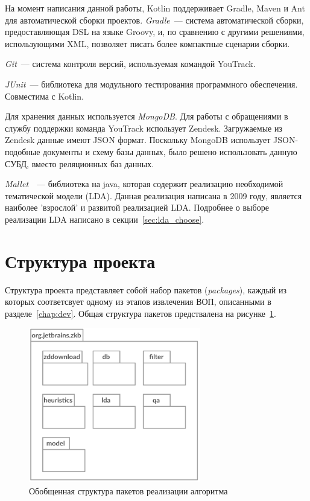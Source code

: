 На момент написания данной работы, Kotlin поддерживает Gradle, Maven и Ant для автоматической сборки проектов. \textit{Gradle}~--- система автоматической сборки, предоставляющая DSL на языке Groovy, и, по сравнению с другими решениями, использующими XML, позволяет писать более компактные сценарии сборки.


\textit{Git}~--- система контроля версий, используемая командой YouTrack.

\textit{JUnit}~--- библиотека для модульного тестирования программного обеспечения. Совместима с Kotlin.

Для хранения данных используется \textit{MongoDB}. Для работы с обращениями в службу поддержки команда YouTrack использует Zendesk. Загружаемые из Zendesk данные имеют JSON формат. Поскольку MongoDB использует JSON-подобные документы и схему базы данных, было решено использовать данную СУБД, вместо реляционных баз данных.

\textit{Mallet}~\cite{MALLET}~--- библиотека на java, которая содержит реализацию необходимой тематической модели (LDA). Данная реализация написана в 2009 году, является наиболее 'взрослой' и развитой реализацией LDA. Подробнее о выборе реализации LDA написано в секции~\ref{sec:lda_choose}.

\section{Структура проекта}

Структура проекта представляет собой набор пакетов (\textit{packages}), каждый из которых соответсвует одному из этапов извлечения ВОП, описанными в разделе~\ref{chap:dev}. Общая структура пакетов предствалена на рисунке~\ref{fig:pckgs}. 

\begin{figure}[tph!]
\centerline{\includegraphics[width=7.5cm]{fig/pckgs.png}}
    \caption{Обобщенная структура пакетов реализации алгоритма}
    \label{fig:pckgs}
\end{figure}


